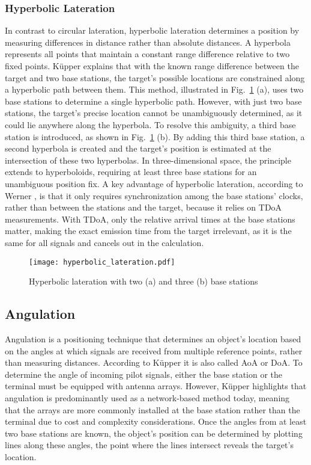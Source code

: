 \subsubsection{Hyperbolic Lateration}
In contrast to circular lateration, hyperbolic lateration determines a position by measuring differences in distance rather than absolute distances. 
A hyperbola represents all points that maintain a constant range difference relative to two fixed points. 
K\"upper \cite{kupper2005location} explains that with the known range difference between the target and two base stations, the target's possible locations are constrained along a hyperbolic path between them. 
This method, illustrated in Fig.~\ref{fig:hyperbolic_lateration} (a), uses two base stations to determine a single hyperbolic path. 
However, with just two base stations, the target's precise location cannot be unambiguously determined, as it could lie anywhere along the hyperbola.
To resolve this ambiguity, a third base station is introduced, as shown in Fig.~\ref{fig:hyperbolic_lateration} (b). By adding this third base station, a second hyperbola is created and the target's position is estimated at the intersection of these two hyperbolas. 
In three-dimensional space, the principle extends to hyperboloids, requiring at least three base stations for an unambiguous position fix.
A key advantage of hyperbolic lateration, according to Werner \cite{werner2014indoor}, is that it only requires synchronization among the base stations' clocks, rather than between the stations and the target, because it relies on \ac{TDoA} measurements. 
With \acs{TDoA}, only the relative arrival times at the base stations matter, making the exact emission time from the target irrelevant, as it is the same for all signals and cancels out in the calculation.

\begin{figure}[htbp]
    \centering
    \texttt{[image: hyperbolic\_lateration.pdf]}
    \caption{Hyperbolic lateration with two (a) and three (b) base stations \cite{kupper2005location}}
    \label{fig:hyperbolic_lateration}
\end{figure}

\subsection{Angulation}
Angulation is a positioning technique that determines an object's location based on the angles at which signals are received from multiple reference points, rather than measuring distances. 
According to K\"upper \cite{kupper2005location} it is also called \ac{AoA} or \ac{DoA}. 
To determine the angle of incoming pilot signals, either the base station or the terminal must be equipped with antenna arrays.
However, K\"upper \cite{kupper2005location} highlights that angulation is predominantly used as a network-based method today, meaning that the arrays are more commonly installed at the base station rather than the terminal due to cost and complexity considerations.
Once the angles from at least two base stations are known, the object's position can be determined by plotting lines along these angles, the point where the lines intersect reveals the target's location. 

